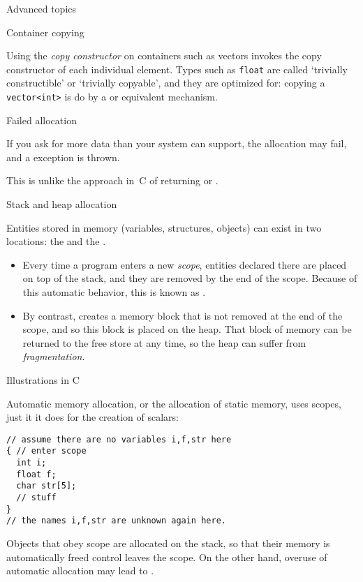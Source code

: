 
 {Advanced topics}

 {Container copying}

Using the
\emph{copy constructor}
on containers such as vectors invokes the copy constructor
of each individual element.
Types such as \lstinline{float} are called
`trivially constructible' or `trivially copyable',
and they are optimized for:
copying a \lstinline{vector<int>} is
do by a  or equivalent mechanism.

 {Failed allocation}

If you ask for more data than your system can support,
the allocation may fail, and a 
exception is thrown.

This is unlike the approach in~C of returning
 or .

 {Stack and heap allocation}
\label{sec:stack-heap}

Entities stored in memory (variables, structures, objects) can exist
in two locations: the  and the
.
\begin{itemize}
\item Every time a program enters a new
  \emph{scope}, entities declared there are
  placed on top of the stack, and they are removed by the end of the
  scope. Because of this automatic behavior,
  this is known as .
\item By contrast, 
  creates a memory block that is not removed at the end of the scope,
  and so this block is placed on the heap.
  That block of memory can be returned to the free store at any
  time, so the heap can suffer from
  \emph{fragmentation}.
\end{itemize}

 {Illustrations in C}

Automatic memory allocation, or the allocation of static memory,
uses scopes, just it it does for the creation of scalars:
\begin{lstlisting}
// assume there are no variables i,f,str here
{ // enter scope
  int i;
  float f;
  char str[5];
  // stuff
}
// the names i,f,str are unknown again here.
\end{lstlisting}
Objects that obey scope are allocated on the stack, so that
their memory is automatically freed control leaves the scope.
On the other hand, overuse of automatic allocation
may lead to .

